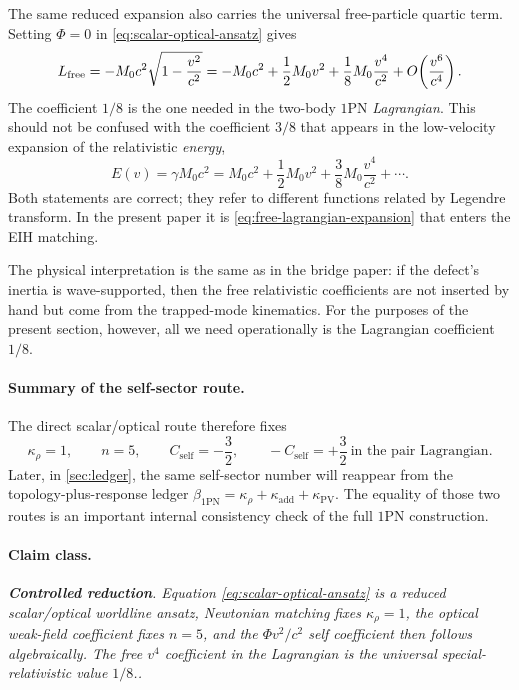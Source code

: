 \documentclass[11pt]{article}
\newcommand{\kadd}{\kappa_{\mathrm{add}}}
\newcommand{\kPV}{\kappa_{\mathrm{PV}}}
\newcommand{\krho}{\kappa_{\rho}}
\newcommand{\betaPN}{\beta_{\mathrm{1PN}}}
\newcommand{\PhiN}{\Phi}
\newcommand{\Cself}{C_{\mathrm{self}}}
\newcommand{\Controlled}{\textbf{Controlled reduction}}
\newcommand{\claimclass}[1]{\paragraph{Claim class.}\emph{#1.}}
\begin{document}
The same reduced expansion also carries the universal free-particle quartic term. Setting
\(\PhiN=0\) in \eqref{eq:scalar-optical-ansatz} gives
\begin{equation}
L_{\rm free}
=
- M_0 c^2\sqrt{1-\frac{v^2}{c^2}}
=
- M_0 c^2
+ \frac12 M_0 v^2
+ \frac18 M_0\frac{v^4}{c^2}
+ O\!\left(\frac{v^6}{c^4}\right).
\label{eq:free-lagrangian-expansion}
\end{equation}
The coefficient \(1/8\) is the one needed in the two-body \(1\)PN \emph{Lagrangian}.
This should not be confused with the coefficient \(3/8\) that appears in the
low-velocity expansion of the relativistic \emph{energy},
\begin{equation}
E(v)=\gamma M_0 c^2
=
M_0 c^2
+ \frac12 M_0 v^2
+ \frac38 M_0\frac{v^4}{c^2}
+ \cdots.
\label{eq:energy-expansion-reminder}
\end{equation}
Both statements are correct; they refer to different functions related by Legendre
transform. In the present paper it is \eqref{eq:free-lagrangian-expansion} that enters
the EIH matching.

The physical interpretation is the same as in the bridge paper: if the defect's inertia
is wave-supported, then the free relativistic coefficients are not inserted by hand but
come from the trapped-mode kinematics. For the purposes of the present section, however,
all we need operationally is the Lagrangian coefficient \(1/8\).

\paragraph{Summary of the self-sector route.}
The direct scalar/optical route therefore fixes
\begin{equation}
\krho=1,
\qquad
n=5,
\qquad
\Cself=-\frac32,
\qquad
-\Cself=+\frac32
\ \text{in the pair Lagrangian}.
\label{eq:self-sector-summary}
\end{equation}
Later, in \cref{sec:ledger}, the same self-sector number will reappear from the
topology-plus-response ledger
\(\betaPN=\krho+\kadd+\kPV\). The equality of those two routes is an important internal
consistency check of the full \(1\)PN construction.

\claimclass{\Controlled. Equation \eqref{eq:scalar-optical-ansatz} is a reduced
scalar/optical worldline ansatz, Newtonian matching fixes \(\krho=1\), the optical weak-field
coefficient fixes \(n=5\), and the \(\PhiN v^2/c^2\) self coefficient then follows
algebraically. The free \(v^4\) coefficient in the Lagrangian is the universal
special-relativistic value \(1/8\).}
\end{document}
